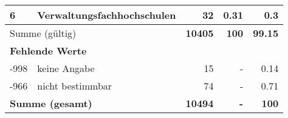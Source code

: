 \begin{longtable}{lXrrr}
     6 &
     \multicolumn{1}{X}{ Verwaltungsfachhochschulen   } &


       \num{32} &
       \num[round-mode=places,round-precision=2]{0.31} &
         \num[round-mode=places,round-precision=2]{0.3} \\
     \midrule
     \multicolumn{2}{l}{Summe (gültig)} &
       \textbf{\num{10405}} &
     \textbf{\num{100}} &
       \textbf{\num[round-mode=places,round-precision=2]{99.15}} \\
     \multicolumn{5}{l}{\textbf{Fehlende Werte}}\\
       -998 &
       keine Angabe &
         \num{15} &
        - &
         \num[round-mode=places,round-precision=2]{0.14} \\
       -966 &
       nicht bestimmbar &
         \num{74} &
        - &
         \num[round-mode=places,round-precision=2]{0.71} \\
     \midrule
     \multicolumn{2}{l}{\textbf{Summe (gesamt)}} &
          \textbf{\num{10494}} &
        \textbf{-} &
        \textbf{\num{100}} \\
     \bottomrule
     \end{longtable}
     
